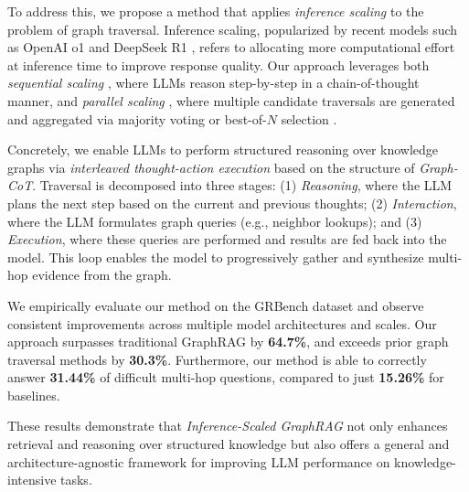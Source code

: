 
To address this, we propose a method that applies \textit{inference scaling} \citep{wu2025inference, yao2023tree, yue2025inferencescalinglongcontextretrieval, snell2025scaling} to the problem of graph traversal. Inference scaling, popularized by recent models such as OpenAI o1 \citep{openai2024o1} and DeepSeek R1 \citep{deepseekai2025deepseekr1incentivizingreasoningcapability}, refers to allocating more computational effort at inference time to improve response quality. Our approach leverages both \textit{sequential scaling} \citep{muennighoff2025s1simpletesttimescaling}, where LLMs reason step-by-step in a chain-of-thought \citep{10.5555/3600270.3602070} manner, and \textit{parallel scaling} \citep{brown2024largelanguagemonkeysscaling,wang2023selfconsistency}, where multiple candidate traversals are generated and aggregated via majority voting or best-of-$N$ selection \citep{jinnai2025regularizedbestofnsamplingminimum}.

Concretely, we enable LLMs to perform structured reasoning over knowledge graphs via \textit{interleaved thought-action execution} based on the structure of \textit{Graph-CoT}\citep{jin2024graph}. Traversal is decomposed into three stages: (1) \textit{Reasoning}, where the LLM plans the next step based on the current and previous thoughts; (2) \textit{Interaction}, where the LLM formulates graph queries (e.g., neighbor lookups); and (3) \textit{Execution}, where these queries are performed and results are fed back into the model. This loop enables the model to progressively gather and synthesize multi-hop evidence from the graph.

We empirically evaluate our method on the GRBench \citep{jin2024graph} dataset and observe consistent improvements across multiple model architectures and scales. Our approach surpasses traditional GraphRAG by {\bf 64.7\%}, and exceeds prior graph traversal methods by \textbf{30.3\%}. Furthermore, our method is able to correctly answer \textbf{31.44\%} of difficult multi-hop questions, compared to just \textbf{15.26\%} for baselines.

These results demonstrate that \textit{Inference-Scaled GraphRAG} not only enhances retrieval and reasoning over structured knowledge but also offers a general and architecture-agnostic framework for improving LLM performance on knowledge-intensive tasks.


